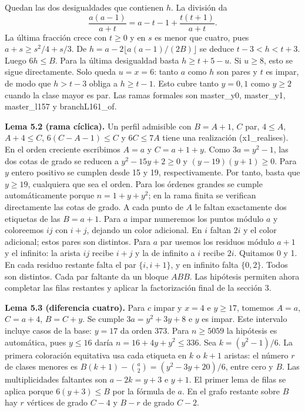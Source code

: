 \documentclass[spanish,11pt,a4paper]{article}
\begin{document}
Quedan las dos desigualdades que contienen \(h\). La división da \[\frac{a(a-1)}{a+t}=a-t-1+\frac{t(t+1)}{a+t}.\] La última fracción crece con \(t\ge0\) y en \(s\) es menor que cuatro, pues \(a+s\ge s^2/4+s/3\). De \(h=a-2\lfloor a(a-1)/(2B)\rfloor\) se deduce \(t-3<h<t+3\). Luego \(6h\le B\). Para la última desigualdad basta \(h\ge t+5-u\). Si \(u\ge8\), esto se sigue directamente. Solo queda \(u=x=6\): tanto \(a\) como \(h\) son pares y \(t\) es impar, de modo que \(h>t-3\) obliga a \(h\ge t-1\). Esto cubre tanto \(y=0,1\) como \(y\ge2\) cuando la clase mayor es par. Las ramas formales son master\_y0, master\_y1, master\_l157 y branchL161\_of.

\textbf{Lema 5.2 (rama cíclica).} Un perfil admisible con \(B=A+1\), \(C\) par, \(4\le A\), \(A+4\le C\), \(6(C-A-1)\le C\) y \(6C\le7A\) tiene una realización (x1\_realises). En el orden creciente escribimos \(A=a\) y \(C=a+1+y\). Como \(3a=y^2-1\), las dos cotas de grado se reducen a \(y^2-15y+2\ge0\) y \((y-19)(y+1)\ge0\). Para \(y\) entero positivo se cumplen desde 15 y 19, respectivamente. Por tanto, basta que \(y\ge19\), cualquiera que sea el orden. Para los órdenes grandes se cumple automáticamente porque \(n=1+y+y^2\); en la rama finita se verifican directamente las cotas de grado. A cada punto de \(A\) le faltan exactamente dos etiquetas de las \(B=a+1\). Para \(a\) impar numeremos los puntos módulo \(a\) y coloreemos \(ij\) con \(i+j\), dejando un color adicional. En \(i\) faltan \(2i\) y el color adicional; estos pares son distintos. Para \(a\) par usemos los residuos módulo \(a+1\) y el infinito: la arista \(ij\) recibe \(i+j\) y la de infinito a \(i\) recibe \(2i\). Quitamos 0 y 1. En cada residuo restante falta el par \(\{i,i+1\}\), y en infinito falta \(\{0,2\}\). Todos son distintos. Cada par faltante da un bloque \(ABB\). Las hipótesis permiten ahora completar las filas restantes y aplicar la factorización final de la sección 3.

\textbf{Lema 5.3 (diferencia cuatro).} Para \(c\) impar y \(x=4\) e \(y\ge17\), tomemos \(A=a\), \(C=a+4\), \(B=C+y\). Se cumple \(3a=y^2+3y+8\) e \(y\) es impar. Este intervalo incluye casos de la base: \(y=17\) da orden 373. Para \(n\ge5059\) la hipótesis es automática, pues \(y\le16\) daría \(n=16+4y+y^2\le336\). Sea \(k=(y^2-1)/6\). La primera coloración equitativa usa cada etiqueta en \(k\) o \(k+1\) aristas: el número \(r\) de clases menores es \(B(k+1)-\binom a2=(y^2-3y+20)/6\), entre cero y \(B\). Las multiplicidades faltantes son \(a-2k=y+3\) e \(y+1\). El primer lema de filas se aplica porque \(6(y+3)\le B\) por la fórmula de \(a\). En el grafo restante sobre \(B\) hay \(r\) vértices de grado \(C-4\) y \(B-r\) de grado \(C-2\).
\end{document}
